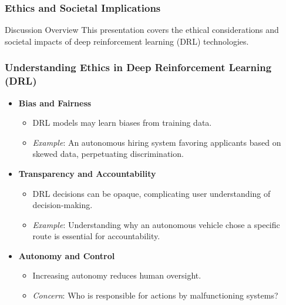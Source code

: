 \documentclass[aspectratio=169]{beamer}
\begin{document}
\begin{frame}[fragile]
    \frametitle{Ethics and Societal Implications}
    \begin{block}{Discussion Overview}
        This presentation covers the ethical considerations and societal impacts of deep reinforcement learning (DRL) technologies.
    \end{block}
\end{frame}

\begin{frame}[fragile]
    \frametitle{Understanding Ethics in Deep Reinforcement Learning (DRL)}
    \begin{itemize}
        \item \textbf{Bias and Fairness}
            \begin{itemize}
                \item DRL models may learn biases from training data.
                \item \textit{Example}: An autonomous hiring system favoring applicants based on skewed data, perpetuating discrimination.
            \end{itemize}
        \item \textbf{Transparency and Accountability}
            \begin{itemize}
                \item DRL decisions can be opaque, complicating user understanding of decision-making.
                \item \textit{Example}: Understanding why an autonomous vehicle chose a specific route is essential for accountability.
            \end{itemize}
        \item \textbf{Autonomy and Control}
            \begin{itemize}
                \item Increasing autonomy reduces human oversight.
                \item \textit{Concern}: Who is responsible for actions by malfunctioning systems?
            \end{itemize}
    \end{itemize}
\end{frame}
\end{document}
